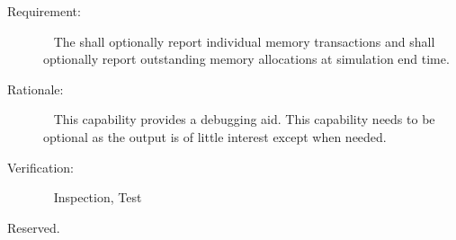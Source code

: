 \label{reqt:reporting}
\begin{description}
\item[Requirement:]\ \newline
  The \ModelDesc shall optionally report individual memory transactions and
  shall optionally report outstanding memory allocations at simulation end time.

\item[Rationale:]\ \newline
  This capability provides a debugging aid. This capability needs to be
  optional as the output is of little interest except when needed.

\item[Verification:]\ \newline
  Inspection, Test
\end{description}


\label{reqt:checkpoint_restart}
Reserved.

